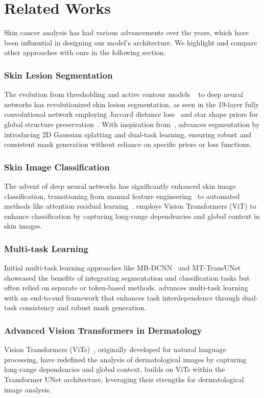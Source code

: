 \section{Related Works}
Skin cancer analysis has had various advancements over the years, which have been influential in designing our model's architecture. We highlight and compare other approaches with ours in the following section.

\subsubsection{Skin Lesion Segmentation}
The evolution from thresholding and active contour models ~\cite{hemalatha2018active, ravichandran2009color,yogarajah2010dynamic} to deep neural networks has revolutionized skin lesion segmentation, as seen in the 19-layer fully convolutional network employing Jaccard distance loss~\cite{nasr2019dense} and star shape priors for global structure preservation~\cite{mirikharaji2018star}. With inspiration from~\cite{centernet}, \ours advances segmentation by introducing 2D Gaussian splatting and dual-task learning, ensuring robust and consistent mask generation without reliance on specific priors or loss functions.

\subsubsection{Skin Image Classification}
The advent of deep neural networks has significantly enhanced skin image classification, transitioning from manual feature engineering~\cite{hagerty2019deep} to automated methods like attention residual learning~\cite{zhang2018skin}. \ours employs Vision Transformers (ViT) to enhance classification by capturing long-range dependencies and global context in skin images.

\subsubsection{Multi-task Learning}
Initial multi-task learning approaches like MB-DCNN~\cite{mb_dcnn} and MT-TransUNet~\cite{yu2016automated} showcased the benefits of integrating segmentation and classification tasks but often relied on separate or token-based methods. \ours advances multi-task learning with an end-to-end framework that enhances task interdependence through dual-task consistency and robust mask generation.

\subsubsection{Advanced Vision Transformers in Dermatology}
Vision Transformers (ViTs)~\cite{vit}, originally developed for natural language processing, have redefined the analysis of dermatological images by capturing long-range dependencies and global context. \ours builds on ViTs within the Transformer UNet architecture, leveraging their strengths for dermatological image analysis.

